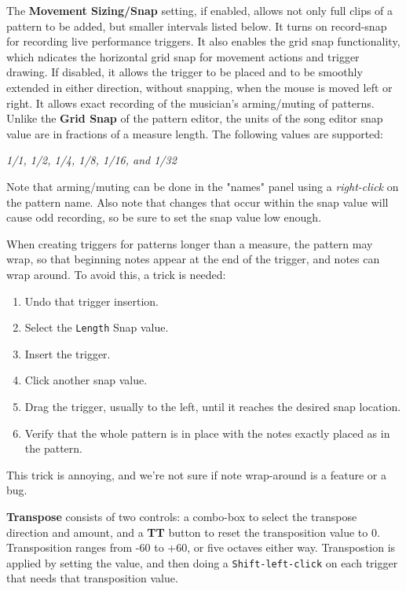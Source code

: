    The \textbf{Movement Sizing/Snap} setting,
   if enabled, allows not only full clips of a pattern to be added,
   but smaller intervals listed below.
   It turns on record-snap for recording live performance triggers.
   It also enables the grid snap functionality,
   which ndicates the horizontal grid snap for movement actions and trigger
   drawing.
   If disabled, it allows the trigger to be placed and to be smoothly extended
   in either direction, without snapping, when the mouse is moved left or
   right. It allows exact recording of the musician's arming/muting of
   patterns.
   Unlike the \textbf{Grid Snap} of the pattern editor, the units
   of the song editor snap value are in fractions of a measure length.
   The following values are supported:

   \textsl{1/1, 1/2, 1/4, 1/8, 1/16, and 1/32}

   Note that arming/muting can be done in the "names" panel using a
   \textsl{right-click} on the pattern name.
   Also note that changes that occur within the snap value will 
   cause odd recording, so be sure to set the snap value low enough.

   When creating triggers for patterns longer than a measure,
   the pattern may wrap, so that beginning notes appear at the end of the
   trigger, and notes can wrap around.
   To avoid this, a trick is needed:

   \begin{enumerate}
      \item Undo that trigger insertion.
      \item Select the \texttt{Length} Snap value.
      \item Insert the trigger.
      \item Click another snap value.
      \item Drag the trigger, usually to the left, until it reaches the
         desired snap location.
      \item Verify that the whole pattern is in place with the notes exactly
         placed as in the pattern.
   \end{enumerate}

   This trick is annoying, and we're not sure if note wrap-around
   is a feature or a bug.

   \textbf{Transpose} consists of two controls:
   a combo-box to select the transpose direction and amount,
   and a \textbf{TT} button to reset the transposition value to 0.
   Transposition ranges from -60 to +60, or five octaves either way.
   Transpostion is applied by setting the value, and then doing
   a \texttt{Shift-left-click} on each trigger that needs that
   transposition value.

